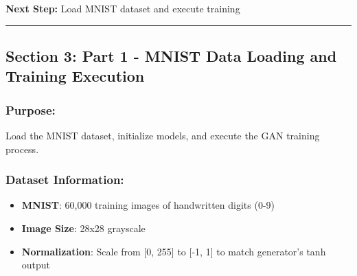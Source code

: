 \documentclass[11pt]{article}
\providecommand{\tightlist}{%
      \setlength{\itemsep}{0pt}\setlength{\parskip}{0pt}}
\begin{document}
\textbf{Next Step:} Load MNIST dataset and execute training

    \begin{center}\rule{0.5\linewidth}{0.5pt}\end{center}

\subsection{Section 3: Part 1 - MNIST Data Loading and Training
Execution}\label{section-3-part-1---mnist-data-loading-and-training-execution}

\subsubsection{Purpose:}\label{purpose}

Load the MNIST dataset, initialize models, and execute the GAN training
process.

\subsubsection{Dataset Information:}\label{dataset-information}

\begin{itemize}
\tightlist
\item
  \textbf{MNIST}: 60,000 training images of handwritten digits (0-9)
\item
  \textbf{Image Size}: 28x28 grayscale
\item
  \textbf{Normalization}: Scale from {[}0, 255{]} to {[}-1, 1{]} to
  match generator's tanh output
\end{itemize}
\end{document}
